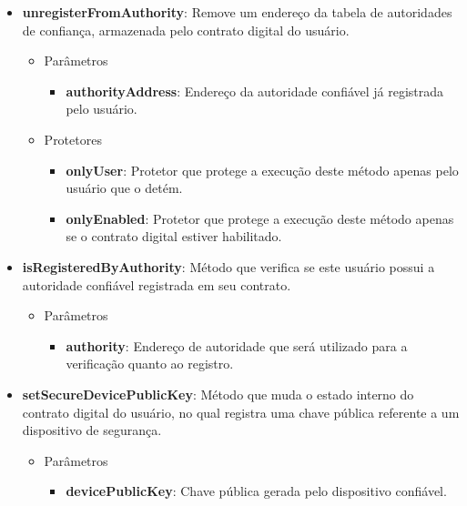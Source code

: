 \documentclass[tcc,capa]{texufpel}
\begin{document}
\begin{itemize}
        \item \textbf{unregisterFromAuthority}: Remove um endereço da tabela de autoridades de confiança, armazenada pelo contrato digital do usuário.
        \begin{itemize}
            \item Parâmetros
            \begin{itemize}
                \item \textbf{authorityAddress}: Endereço da autoridade confiável já registrada pelo usuário.
            \end{itemize}
            
            \item Protetores
            \begin{itemize}
                \item \textbf{onlyUser}: Protetor que protege a execução deste método apenas pelo usuário que o detém.
                \item \textbf{onlyEnabled}: Protetor que protege a execução deste método apenas se o contrato digital estiver habilitado.
            \end{itemize}
        \end{itemize}
            
        \item \textbf{isRegisteredByAuthority}: Método que verifica se este usuário possui a autoridade confiável registrada em seu contrato.
        \begin{itemize}
            \item Parâmetros
            \begin{itemize}
                \item \textbf{authority}: Endereço de autoridade que será utilizado para a verificação quanto ao registro.
            \end{itemize}
        \end{itemize}
        
        \item \textbf{setSecureDevicePublicKey}: Método que muda o estado interno do contrato digital do usuário, no qual registra uma chave pública referente a um dispositivo de segurança.
        \begin{itemize}
            \item Parâmetros
            \begin{itemize}
                \item \textbf{devicePublicKey}: Chave pública gerada pelo dispositivo confiável.
            \end{itemize}
            

\end{itemize}
\end{itemize}
\end{document}
